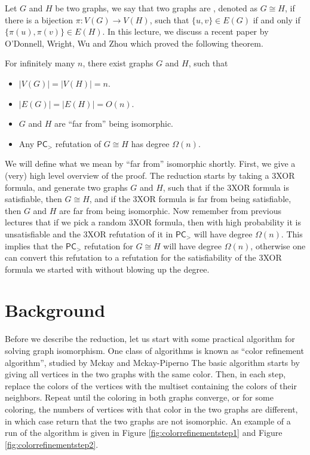 \documentclass[a4paper,twoside,justified]{tufte-handout}
\begin{document}
 

Let $G$ and $H$ be two graphs, we say that two graphs are ,
denoted as $G \cong H$,
if there is a bijection $\pi: V(G) \to V(H)$, such that $\{u,v\} \in E(G)$
if and only if $\{\pi(u),\pi(v)\} \in E(H)$. In this lecture, we discuss
a recent paper by O'Donnell, Wright, Wu and Zhou \cite{robustgraphiso} which proved the following
theorem.

\begin{theorem}\label{thm:main}
  For infinitely many $n$, there exist graphs $G$ and $H$, such that
  \begin{itemize}
    \item $|V(G)|=|V(H)|=n$.
    \item $|E(G)|=|E(H)|=O(n)$.
    \item $G$ and $H$ are ``far from'' being isomorphic.
    \item Any $\mathsf{PC}_{>}$ refutation of $G \cong H$ has degree $\Omega(n)$.
  \end{itemize}
\end{theorem}

We will define what we mean by ``far from'' isomorphic shortly. First, we give a (very) high level
overview of the proof. The reduction starts by taking a 3XOR formula, and generate two graphs $G$ and $H$, such
that if the 3XOR formula is satisfiable, then $G \cong H$, and if the 3XOR formula is far from being satisfiable,
then $G$ and $H$ are far from being isomorphic. Now remember from previous lectures that if we pick a random 3XOR formula,
then with high probability it is unsatisfiable and the 3XOR refutation of it in $\mathsf{PC}_{>}$ will have degree $\Omega(n)$.
This implies that the $\mathsf{PC}_{>}$ refutation for $G \cong H$ will have degree $\Omega(n)$, otherwise one
can convert this refutation to a refutation for the satisfiability of the 3XOR formula we started with without blowing up the degree.

\section{Background}
Before we describe the reduction, let us start with some practical algorithm for solving graph isomorphism. 
One class of algorithms is known as ``color refinement algorithm'', studied by Mckay \cite{mckay} and Mckay-Piperno \cite{mckay14}
The basic algorithm starts by giving all vertices in the two graphs with the same color. 
Then, in each step, replace the colors of the vertices with the multiset containing the colors of their neighbors.
Repeat until the coloring in both graphs converge, or for some coloring, the numbers of vertices with that color
in the two graphs are different, in which case return that the two graphs are not isomorphic.
An example of a run of the algorithm is given in Figure \ref{fig:colorrefinementstep1} and Figure
\ref{fig:colorrefinementstep2}.
\end{document}
